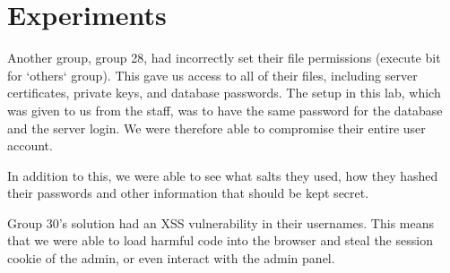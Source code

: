 \section{Experiments}
\label{sec:experiments}

Another group, group 28, had incorrectly set their file permissions (execute bit for `others` group).
This gave us access to all of their files, including server certificates, private keys, and database passwords.
The setup in this lab, which was given to us from the staff, was to have the same password for the database and the server login.
We were therefore able to compromise their entire user account.


In addition to this, we were able to see what salts they used, how they hashed their passwords and other information that should be kept secret.


Group 30's solution had an XSS vulnerability in their usernames.
This means that we were able to load harmful code into the browser and steal the session cookie of the admin, or even interact with the admin panel.
